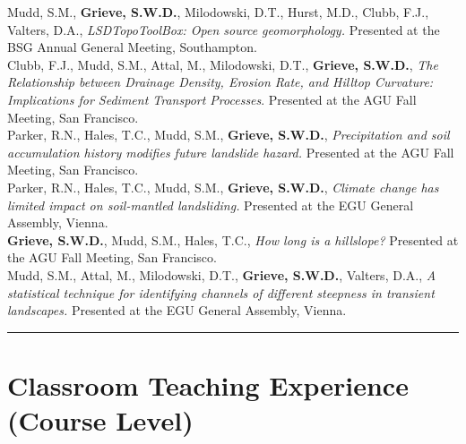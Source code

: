 \documentclass[10pt, a4paper]{article}
\newcommand{\years}[1]{\marginnote{\scriptsize #1}}
\begin{document}
\years{2015}Mudd, S.M., \textbf{Grieve, S.W.D.}, Milodowski, D.T., Hurst, M.D., Clubb, F.J., Valters, D.A., \textit{LSDTopoToolBox: Open source geomorphology.} Presented at the BSG Annual General Meeting, Southampton.\\[0.05cm]

\years{2015}Clubb, F.J., Mudd, S.M., Attal, M., Milodowski, D.T., \textbf{Grieve, S.W.D.}, \textit{The Relationship between Drainage Density, Erosion Rate, and Hilltop Curvature: Implications for Sediment Transport Processes}. Presented at the AGU Fall Meeting, San Francisco.\\[0.05cm]

\years{2015}Parker, R.N., Hales, T.C., Mudd, S.M., \textbf{Grieve, S.W.D.}, \textit{Precipitation and soil accumulation history modifies future landslide hazard.} Presented at the AGU Fall Meeting, San Francisco.\\[0.05cm]

\years{2015}Parker, R.N., Hales, T.C., Mudd, S.M., \textbf{Grieve, S.W.D.}, \textit{Climate change has limited impact on soil-mantled landsliding.} Presented at the EGU General Assembly, Vienna.\\[0.05cm]

\years{2014}\textbf{Grieve, S.W.D.}, Mudd, S.M., Hales, T.C., \textit{How long is a hillslope?} Presented at the AGU Fall Meeting, San Francisco.\\[0.05cm]

\years{2014}Mudd, S.M., Attal, M., Milodowski, D.T., \textbf{Grieve, S.W.D.}, Valters, D.A., \textit{A statistical technique for identifying channels of different steepness in transient landscapes.} Presented at the EGU General Assembly, Vienna.\\[0.05cm]

\hrule
\section*{Classroom Teaching Experience (Course Level)}
\end{document}
